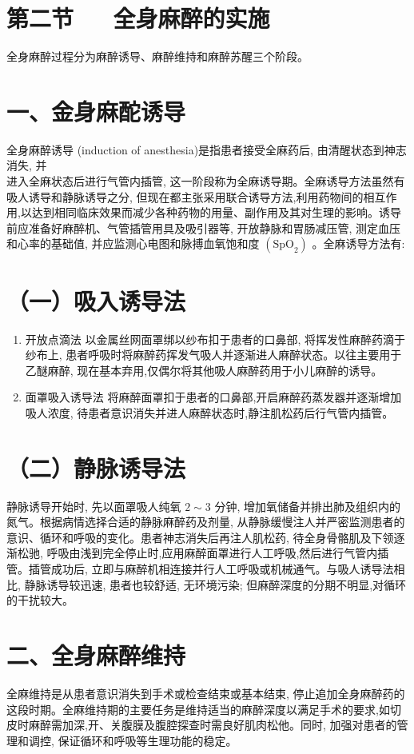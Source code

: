 \documentclass[10pt]{article}
\begin{document}
\section*{第二节 $\quad$ 全身麻醉的实施}
全身麻醉过程分为麻醉诱导、麻醉维持和麻醉苏醒三个阶段。

\section*{一、金身麻酡诱导}
全身麻醉诱导 (induction of anesthesia)是指患者接受全麻药后, 由清醒状态到神志消失, 并\\
进入全麻状态后进行气管内插管, 这一阶段称为全麻诱导期。全麻诱导方法虽然有吸人诱导和静脉诱导之分, 但现在都主张采用联合诱导方法,利用药物间的相互作用,以达到相同临床效果而减少各种药物的用量、副作用及其对生理的影响。诱导前应准备好麻醉机、气管插管用具及吸引器等, 开放静脉和胃肠减压管, 测定血压和心率的基础值, 并应监测心电图和脉搏血氧饱和度 $\left(\mathrm{SpO}_{2}\right)$ 。全麻诱导方法有:

\section*{（一）吸入诱导法}
\begin{enumerate}
  \item 开放点滴法 以金属丝网面罩绑以纱布扣于患者的口鼻部, 将挥发性麻醉药滴于纱布上, 患者呼吸时将麻醉药挥发气吸人并逐渐进人麻醉状态。以往主要用于乙醚麻醉, 现在基本弃用,仅偶尔将其他吸人麻醉药用于小儿麻醉的诱导。

  \item 面罩吸入诱导法 将麻醉面罩扣于患者的口鼻部,开启麻醉药蒸发器并逐渐增加吸人浓度, 待患者意识消失并进人麻醉状态时,静注肌松药后行气管内插管。

\end{enumerate}

\section*{（二）静脉诱导法}
静脉诱导开始时, 先以面罩吸人纯氧 $2 \sim 3$ 分钟, 增加氧储备并排出肺及组织内的氮气。根据病情选择合适的静脉麻醉药及剂量, 从静脉缓慢注人并严密监测患者的意识、循环和呼吸的变化。患者神志消失后再注人肌松药, 待全身骨骼肌及下领逐渐松驰, 呼吸由浅到完全停止时,应用麻醉面罩进行人工呼吸,然后进行气管内插管。插管成功后, 立即与麻醉机相连接并行人工呼吸或机械通气。与吸人诱导法相比, 静脉诱导较迅速, 患者也较舒适, 无环境污染; 但麻醉深度的分期不明显,对循环的干扰较大。

\section*{二、全身麻醉维持}
全麻维持是从患者意识消失到手术或检查结束或基本结束, 停止追加全身麻醉药的这段时期。全麻维持期的主要任务是维持适当的麻醉深度以满足手术的要求,如切皮时麻醉需加深,开、关腹膜及腹腔探查时需良好肌肉松他。同时, 加强对患者的管理和调控, 保证循环和呼吸等生理功能的稳定。
\end{document}
